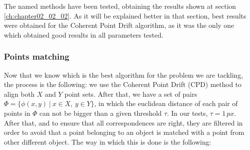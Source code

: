 The named methods have been tested, obtaining the results shown at section \ref{ch:chapter02_02_02}. As it will be explained better in that section, best results were obtained for the Coherent Point Drift algorithm, as it was the only one which obtained good results in all parameters tested.

\subsubsection{Points matching}\label{ch:chapter02_01_02_02}

Now that we know which is the best algorithm for the problem we are tackling, the process is the following: we use 
the Coherent Point Drift (CPD) method to align both $X$ and $Y$ point sets. After that, we have a set 
of pairs $\Phi = \{ \phi(x,y) ~|~ x \in X, ~y \in Y \}$, in which the euclidean distance of each pair of points in 
$\Phi$ can not be bigger than a given threshold $\tau$. In our tests, $\tau = 1\,px$. After that, and to ensure that all correspondences are right, 
they are filtered in order to avoid that a point belonging to an object is matched with a point from other different 
object. 
The way in which this is done is the following:
